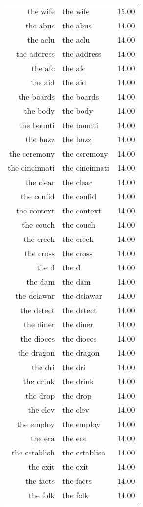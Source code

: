 \begin{table}[ht]
\begin{tabular}{rlr}
  the wife & the wife & 15.00 \\ 
  the abus & the abus & 14.00 \\ 
  the aclu & the aclu & 14.00 \\ 
  the address & the address & 14.00 \\ 
  the afc & the afc & 14.00 \\ 
  the aid & the aid & 14.00 \\ 
  the boards & the boards & 14.00 \\ 
  the body & the body & 14.00 \\ 
  the bounti & the bounti & 14.00 \\ 
  the buzz & the buzz & 14.00 \\ 
  the ceremony & the ceremony & 14.00 \\ 
  the cincinnati & the cincinnati & 14.00 \\ 
  the clear & the clear & 14.00 \\ 
  the confid & the confid & 14.00 \\ 
  the context & the context & 14.00 \\ 
  the couch & the couch & 14.00 \\ 
  the creek & the creek & 14.00 \\ 
  the cross & the cross & 14.00 \\ 
  the d & the d & 14.00 \\ 
  the dam & the dam & 14.00 \\ 
  the delawar & the delawar & 14.00 \\ 
  the detect & the detect & 14.00 \\ 
  the diner & the diner & 14.00 \\ 
  the dioces & the dioces & 14.00 \\ 
  the dragon & the dragon & 14.00 \\ 
  the dri & the dri & 14.00 \\ 
  the drink & the drink & 14.00 \\ 
  the drop & the drop & 14.00 \\ 
  the elev & the elev & 14.00 \\ 
  the employ & the employ & 14.00 \\ 
  the era & the era & 14.00 \\ 
  the establish & the establish & 14.00 \\ 
  the exit & the exit & 14.00 \\ 
  the facts & the facts & 14.00 \\ 
  the folk & the folk & 14.00 \\ 

\end{tabular}
\end{table}
